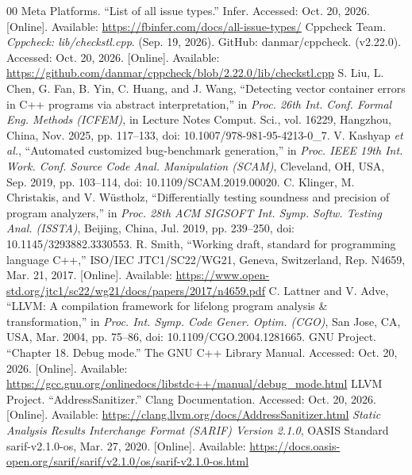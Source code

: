 \documentclass[conference]{IEEEtran}
\begin{document}
\begin{thebibliography}{00}
 Meta Platforms. ``List of all issue types.'' Infer. Accessed: Oct. 20, 2026. [Online]. Available: \url{https://fbinfer.com/docs/all-issue-types/}
 Cppcheck Team. \textit{Cppcheck: lib/checkstl.cpp}. (Sep. 19, 2026). GitHub: danmar/cppcheck. (v2.22.0). Accessed: Oct. 20, 2026. [Online]. Available: \url{https://github.com/danmar/cppcheck/blob/2.22.0/lib/checkstl.cpp}
 S. Liu, L. Chen, G. Fan, B. Yin, C. Huang, and J. Wang, ``Detecting vector container errors in C++ programs via abstract interpretation,'' in \textit{Proc. 26th Int. Conf. Formal Eng. Methods (ICFEM)}, in Lecture Notes Comput. Sci., vol. 16229, Hangzhou, China, Nov. 2025, pp. 117--133, doi: 10.1007/978-981-95-4213-0\_7.
 V. Kashyap \textit{et al.}, ``Automated customized bug-benchmark generation,'' in \textit{Proc. IEEE 19th Int. Work. Conf. Source Code Anal. Manipulation (SCAM)}, Cleveland, OH, USA, Sep. 2019, pp. 103--114, doi: 10.1109/SCAM.2019.00020.
 C. Klinger, M. Christakis, and V. W\"{u}stholz, ``Differentially testing soundness and precision of program analyzers,'' in \textit{Proc. 28th ACM SIGSOFT Int. Symp. Softw. Testing Anal. (ISSTA)}, Beijing, China, Jul. 2019, pp. 239--250, doi: 10.1145/3293882.3330553.
 R. Smith, ``Working draft, standard for programming language C++,'' ISO/IEC JTC1/SC22/WG21, Geneva, Switzerland, Rep. N4659, Mar. 21, 2017. [Online]. Available: \url{https://www.open-std.org/jtc1/sc22/wg21/docs/papers/2017/n4659.pdf}
 C. Lattner and V. Adve, ``LLVM: A compilation framework for lifelong program analysis \& transformation,'' in \textit{Proc. Int. Symp. Code Gener. Optim. (CGO)}, San Jose, CA, USA, Mar. 2004, pp. 75--86, doi: 10.1109/CGO.2004.1281665.
 GNU Project. ``Chapter 18. Debug mode.'' The GNU C++ Library Manual. Accessed: Oct. 20, 2026. [Online]. Available: \url{https://gcc.gnu.org/onlinedocs/libstdc++/manual/debug_mode.html}
 LLVM Project. ``AddressSanitizer.'' Clang Documentation. Accessed: Oct. 20, 2026. [Online]. Available: \url{https://clang.llvm.org/docs/AddressSanitizer.html}
 \textit{Static Analysis Results Interchange Format (SARIF) Version 2.1.0}, OASIS Standard sarif-v2.1.0-os, Mar. 27, 2020. [Online]. Available: \url{https://docs.oasis-open.org/sarif/sarif/v2.1.0/os/sarif-v2.1.0-os.html}
\end{thebibliography}
\end{document}
